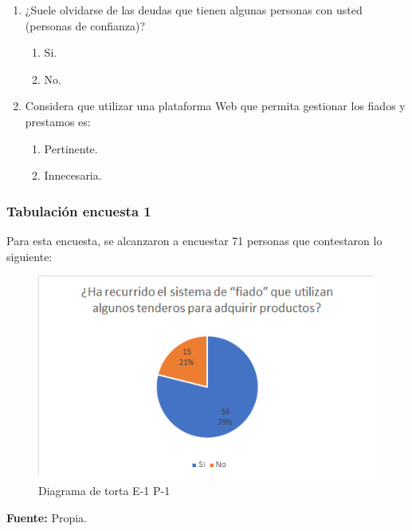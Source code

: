 {\begin{enumerate}
				\item ¿Suele olvidarse de las deudas que tienen algunas personas con usted (personas de confianza)?
				
					\begin{enumerate}
						\item Si.
						\item No.
					\end{enumerate}	
				
				\item Considera que utilizar una plataforma Web que permita gestionar los fiados y prestamos es:
				
					\begin{enumerate}
						\item Pertinente.
						\item Innecesaria.
					\end{enumerate}
				
			\end{enumerate}
		
		\subsubsection*{Tabulación encuesta 1}
		{Para esta encuesta, se alcanzaron a encuestar 71 personas que contestaron lo siguiente:
		
		\begin{figure}[H]
			\centering
			\includegraphics[width=0.8\linewidth]{annexes/e1-p1.png}
			\caption{Diagrama de torta E-1 P-1}
		\end{figure}
		\begin{center}
			\textbf{Fuente:} Propia.
		\end{center}
	
}}
